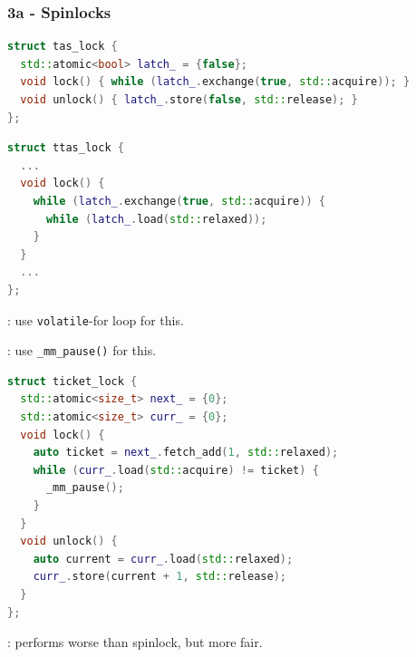 \subsubsection*{3a - Spinlocks}

\begin{lstlisting}[language=C++, escapechar=\$]
struct tas_lock {
  std::atomic<bool> latch_ = {false};
  void lock() { while (latch_.exchange(true, std::acquire)); }
  void unlock() { latch_.store(false, std::release); }
};
\end{lstlisting}

\begin{lstlisting}[language=C++, escapechar=\$]
struct ttas_lock {
  ...
  void lock() {
    while (latch_.exchange(true, std::acquire)) {
      while (latch_.load(std::relaxed));
    }
  }
  ...
};
\end{lstlisting}

: use \texttt{volatile}-for loop for this.

\hSep

: use \texttt{\_mm\_pause()} for this.

\hSep

\begin{lstlisting}[language=C++, escapechar=\$]
struct ticket_lock {
  std::atomic<size_t> next_ = {0};
  std::atomic<size_t> curr_ = {0};
  void lock() {
    auto ticket = next_.fetch_add(1, std::relaxed);
    while (curr_.load(std::acquire) != ticket) {
      _mm_pause();
    }
  }
  void unlock() {
    auto current = curr_.load(std::relaxed);
    curr_.store(current + 1, std::release);
  }
};
\end{lstlisting}
: performs worse than spinlock, but more fair.

\hSep

